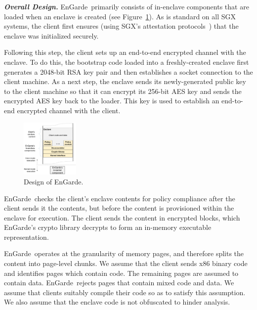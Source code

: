 \documentclass[conference,compsoc]{IEEEtran}
\newcommand{\figref}[1]{Figure~\ref{#1}}
\newcommand{\mycaption}[2]{\caption{#1}#2}
\newcommand{\myparagraph}[1]{\parskip -4pt \indent\par\noindent\textbf{\textit{#1}} \parskip 0pt}
\newcommand{\tool}{EnGarde\xspace} %
\begin{document}


\myparagraph{Overall Design.} 
%
\tool\ primarily consists of in-enclave components that are loaded when an
enclave is created (see \figref{figure:overalldesign}). As is standard on all
SGX systems, the client first ensures (using SGX's attestation
protocols~\cite{sgx:attest:hasp13}) that the enclave was initialized securely.

Following this step, the client sets up an end-to-end encrypted channel with
the enclave. To do this, the bootstrap code loaded into a freshly-created
enclave first generates a 2048-bit RSA key pair and then establishes a socket
connection to the client machine. As a next step, the enclave sends its
newly-generated public key to the client machine so that it can encrypt its
256-bit AES key and sends the encrypted AES key back to the loader. This key is
used to establish an end-to-end encrypted channel with the client.

\begin{figure}
\centering
\includegraphics[keepaspectratio=true,width=0.25\textwidth]{engarde.eps}
\indent\vspace{-0.3cm}
\mycaption{Design of \tool.}{\label{figure:overalldesign}}
\indent\vspace{-0.7cm}
\end{figure}

\tool\ checks the client's enclave contents for policy compliance after the
client sends it the contents, but before the content is provisioned within the
enclave for execution. The client sends the content in encrypted blocks, which
\tool's crypto library decrypts to form an in-memory executable representation.

\tool\ operates at the granularity of memory pages, and therefore
splits the content into page-level chunks.  We assume that the client sends x86
binary code and identifies pages which contain code. The remaining pages are
assumed to contain data. \tool\ rejects pages that contain mixed code and data.
We assume that clients suitably compile their code so as to satisfy this
assumption. We also assume that the enclave code is not obfuscated to hinder
analysis.
\end{document}
